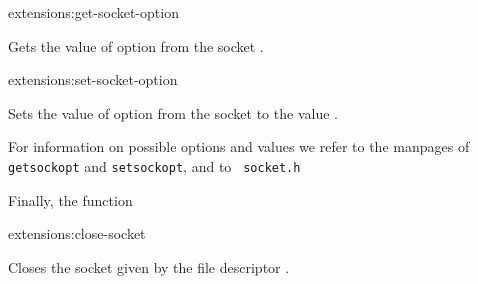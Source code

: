 \begin{defun}{extensions:}{get-socket-option}{%
    }
  
  Gets the value of option  from the socket .

\end{defun}

\begin{defun}{extensions:}{set-socket-option}{%
    }
  
  Sets the value of option  from the socket 
  to the value .

\end{defun}

For information on possible options and values we refer to the
manpages of {\tt getsockopt} and {\tt setsockopt}, and to {\tt
 socket.h}

Finally, the function

\begin{defun}{extensions:}{close-socket}{%
    }

  Closes the socket given by the file descriptor .

\end{defun}
